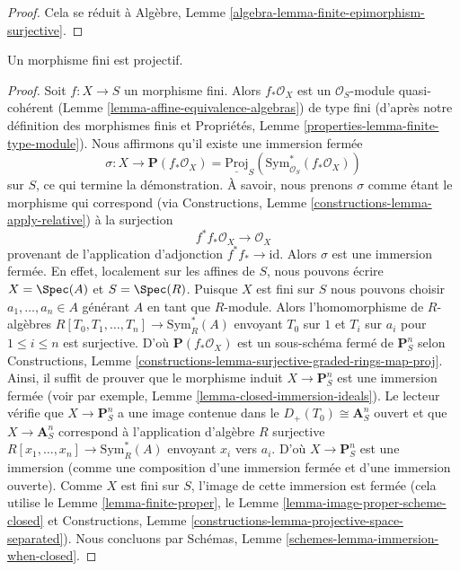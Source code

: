 \begin{proof}
Cela se réduit
à Algèbre, Lemme \ref{algebra-lemma-finite-epimorphism-surjective}.
\end{proof}

\begin{lemma}
\label{lemma-finite-projective}
Un morphisme fini est projectif.
\end{lemma}

\begin{proof}
Soit $f : X \to S$ un morphisme fini. Alors $f_*\mathcal{O}_X$ est
un $\mathcal{O}_S$-module quasi-cohérent
(Lemme \ref{lemma-affine-equivalence-algebras}) de type fini (d'après
notre
définition des morphismes finis et
Propriétés, Lemme \ref{properties-lemma-finite-type-module}). Nous affirmons qu'il
existe une immersion fermée
$$
\sigma :
X
\longrightarrow
\mathbf{P}(f_*\mathcal{O}_X) =
\underline{\text{Proj}}_S(\text{Sym}^*_{\mathcal{O}_S}(f_*\mathcal{O}_X))
$$
sur $S$, ce qui termine
la démonstration. À savoir, nous prenons $\sigma$ comme étant
le morphisme qui correspond (via Constructions, Lemme \ref{constructions-lemma-apply-relative})
à la surjection
$$
f^*f_*\mathcal{O}_X \longrightarrow \mathcal{O}_X
$$
provenant de l'application d'adjonction $f^*f_* \to \text{id}$. Alors $\sigma$
est une immersion fermée. En effet, localement sur les
affines de $S$, nous pouvons écrire $X = \Spec(A)$ et $S = \Spec(R)$.
Puisque $X$ est fini sur $S$ nous pouvons choisir
$a_1, \ldots, a_n \in A$ générant $A$ en tant que $R$-module.
Alors l'homomorphisme de $R$-algèbres $R[T_0, T_1, \ldots, T_n] \to \text{Sym}_R^*(A)$ envoyant $T_0$
sur $1$ et $T_i$ sur $a_i$ pour $1 \leq i \leq n$
est surjective. D'où $\mathbf{P}(f_*\mathcal{O}_X)$ est
un sous-schéma fermé de $\mathbf{P}^n_S$ selon Constructions,
Lemme \ref{constructions-lemma-surjective-graded-rings-map-proj}. Ainsi, il suffit de prouver
que le morphisme induit $X \to \mathbf{P}^n_S$ est une
immersion fermée (voir par exemple, Lemme \ref{lemma-closed-immersion-ideals}).
Le lecteur vérifie que $X \to \mathbf{P}^n_S$ a une image contenue
dans le $D_+(T_0) \cong \mathbf{A}^n_S$ ouvert et que $X \to \mathbf{A}^n_S$ correspond à l'application
d'algèbre $R$ surjective
$R[x_1, \ldots, x_n] \to \text{Sym}_R^*(A)$ envoyant $x_i$ vers $a_i$.
D'où $X \to \mathbf{P}^n_S$ est une immersion (comme une composition
d'une immersion fermée et d'une
immersion ouverte). Comme $X$ est fini sur
$S$, l'image de cette immersion
est fermée (cela utilise le Lemme
\ref{lemma-finite-proper}, le Lemme \ref{lemma-image-proper-scheme-closed} et Constructions, Lemme \ref{constructions-lemma-projective-space-separated}).
Nous concluons par Schémas, Lemme \ref{schemes-lemma-immersion-when-closed}.
\end{proof}







